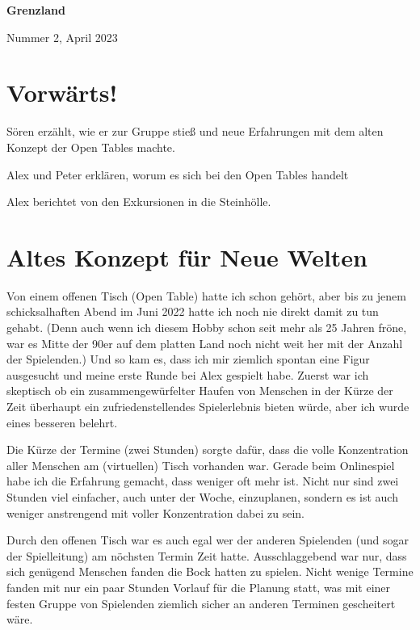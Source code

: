 \documentclass[11pt]{wbzine}
\begin{document}


\shipout\null
\addtocounter{page}{-1}

{\bfseries\fontsize{70}{55}
 \selectfont Grenzland \par}%
 \hrulefill
 Nummer 2, April 2023

\tableofcontents

\begin{multicols}{2}

\section{Vorwärts!}

Sören erzählt, wie er zur Gruppe stieß und neue Erfahrungen mit dem alten Konzept der Open Tables machte.

Alex und Peter erklären, worum es sich bei den Open Tables handelt

Alex berichtet von den Exkursionen in die Steinhölle.


\section{Altes Konzept für Neue Welten}
Von einem offenen Tisch (Open Table) hatte ich schon gehört, aber bis
zu jenem schicksalhaften Abend im Juni 2022 hatte ich noch nie direkt
damit zu tun gehabt. (Denn auch wenn ich diesem Hobby schon seit mehr
als 25 Jahren fröne, war es Mitte der 90er auf dem platten Land noch
nicht weit her mit der Anzahl der Spielenden.) Und so kam es, dass ich
mir ziemlich spontan eine Figur ausgesucht und meine erste Runde bei Alex
gespielt habe. Zuerst war ich skeptisch ob ein zusammengewürfelter Haufen
von Menschen in der Kürze der Zeit überhaupt ein zufriedenstellendes
Spielerlebnis bieten würde, aber ich wurde eines besseren belehrt.

Die Kürze der Termine (zwei Stunden) sorgte dafür, dass die volle
Konzentration aller Menschen am (virtuellen) Tisch vorhanden war. Gerade
beim Onlinespiel habe ich die Erfahrung gemacht, dass weniger oft
mehr ist. Nicht nur sind zwei Stunden viel einfacher, auch unter der
Woche, einzuplanen, sondern es ist auch weniger anstrengend mit voller
Konzentration dabei zu sein.

Durch den offenen Tisch war es auch egal wer der anderen Spielenden (und
sogar der Spielleitung) am nöchsten Termin Zeit hatte. Ausschlaggebend
war nur, dass sich genügend Menschen fanden die Bock hatten zu
spielen. Nicht wenige Termine fanden mit nur ein paar Stunden Vorlauf
für die Planung statt, was mit einer festen Gruppe von Spielenden
ziemlich sicher an anderen Terminen gescheitert wäre.


\end{multicols}
\end{document}
